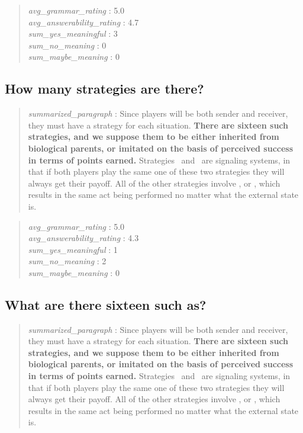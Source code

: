 \begin{quote}
\emph{avg\_grammar\_rating} : 5.0\\
\emph{avg\_answerability\_rating} : 4.7\\
\emph{sum\_yes\_meaningful} : 3\\
\emph{sum\_no\_meaning} : 0\\
\emph{sum\_maybe\_meaning} : 0
\end{quote}

\hypertarget{how-many-strategies-are-there}{%
\subsection{How many strategies are
there?}\label{how-many-strategies-are-there}}

\begin{quote}
\emph{summarized\_paragraph} : Since players will be both sender and
receiver, they must have a strategy for each situation. \textbf{There
are sixteen such strategies, and we suppose them to be either inherited
from biological parents, or imitated on the basis of perceived success
in terms of points earned.} Strategies ~and ~are signaling systems, in
that if both players play the same one of these two strategies they will
always get their payoff. All of the other strategies involve , or ,
which results in the same act being performed no matter what the
external state is.
\end{quote}

\begin{quote}
\emph{avg\_grammar\_rating} : 5.0\\
\emph{avg\_answerability\_rating} : 4.3\\
\emph{sum\_yes\_meaningful} : 1\\
\emph{sum\_no\_meaning} : 2\\
\emph{sum\_maybe\_meaning} : 0
\end{quote}

\hypertarget{what-are-there-sixteen-such-as}{%
\subsection{What are there sixteen such
as?}\label{what-are-there-sixteen-such-as}}

\begin{quote}
\emph{summarized\_paragraph} : Since players will be both sender and
receiver, they must have a strategy for each situation. \textbf{There
are sixteen such strategies, and we suppose them to be either inherited
from biological parents, or imitated on the basis of perceived success
in terms of points earned.} Strategies ~and ~are signaling systems, in
that if both players play the same one of these two strategies they will
always get their payoff. All of the other strategies involve , or ,
which results in the same act being performed no matter what the
external state is.
\end{quote}

